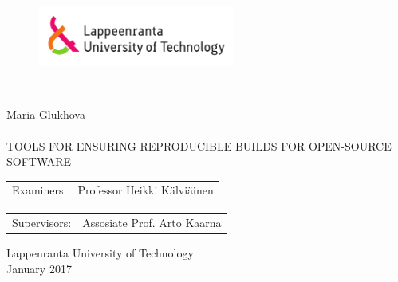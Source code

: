 
\thispagestyle{empty} 
\setlength{\parindent}{0pt}
\begin{figure}
\includegraphics[width=65mm]{./figs/Merkki_Logo_CMYK}\\
\end{figure}
~\\

\vspace{60mm}

{\sffamily\large Maria Glukhova\\
\\
\MakeUppercase{\Large Tools for Ensuring Reproducible Builds for Open-Source Software}}\\



\begin{tabular}{l p{11.0cm}}  
  
Examiners: & Professor \foreignlanguage{finnish}{Heikki Kälviäinen}\\

\end {tabular}

\begin{tabular}{l p{11.0cm}}  
  
Supervisors: & Assosiate Prof. Arto Kaarna\\

\end {tabular}





\begin{center}
Lappenranta University of Technology\\
January 2017

 \end{center}
\pagebreak

